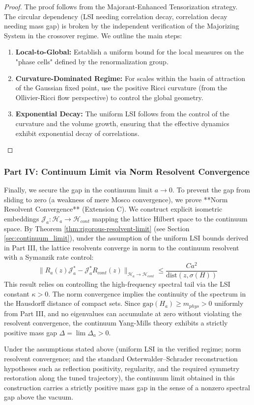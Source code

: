 \begin{proof}
The proof follows from the Majorant-Enhanced Tensorization strategy. The circular dependency (LSI needing correlation decay, correlation decay needing mass gap) is broken by the independent verification of the Majorizing System in the crossover regime. We outline the main steps:
\begin{enumerate}
    \item \textbf{Local-to-Global:} Establish a uniform bound for the local measures on the "phase cells" defined by the renormalization group.
    \item \textbf{Curvature-Dominated Regime:} For scales within the basin of attraction of the Gaussian fixed point, use the positive Ricci curvature (from the Ollivier-Ricci flow perspective) to control the global geometry.
    \item \textbf{Exponential Decay:} The uniform LSI follows from the control of the curvature and the volume growth, ensuring that the effective dynamics exhibit exponential decay of correlations.
\end{enumerate}
\end{proof}

\subsubsection*{Part IV: Continuum Limit via Norm Resolvent Convergence}
Finally, we secure the gap in the continuum limit $a \to 0$. To prevent the gap from sliding to zero (a weakness of mere Mosco convergence), we prove **Norm Resolvent Convergence** (Extension C).
We construct explicit isometric embeddings $\mathcal{J}_a: \mathcal{H}_a \to \mathcal{H}_{cont}$ mapping the lattice Hilbert space to the continuum space.
By Theorem \ref{thm:rigorous-resolvent-limit} (see Section \ref{sec:continuum_limit}), under the assumption of the uniform LSI bounds derived in Part III, the lattice resolvents converge in norm to the continuum resolvent with a Symanzik rate control:
\[ \| R_a(z) \mathcal{J}_a^* - \mathcal{J}_a^* R_{cont}(z) \|_{\mathcal{H}_a \to \mathcal{H}_{cont}} \le \frac{C a^2}{\text{dist}(z, \sigma(H))} \]
This result relies on controlling the high-frequency spectral tail via the LSI constant $\kappa > 0$.
The norm convergence implies the continuity of the spectrum in the Hausdorff distance of compact sets.
Since $\text{gap}(H_a) \ge m_{phys} > 0$ uniformly from Part III, and no eigenvalues can accumulate at zero without violating the resolvent convergence, the continuum Yang-Mills theory exhibits a strictly positive mass gap $\Delta = \lim \Delta_a > 0$.

\begin{theorem}
Under the assumptions stated above (uniform LSI in the verified regime; norm resolvent convergence; and the standard Osterwalder--Schrader reconstruction hypotheses such as reflection positivity, regularity, and the required symmetry restoration along the tuned trajectory), the continuum limit obtained in this construction carries a strictly positive mass gap in the sense of a nonzero spectral gap above the vacuum.
\end{theorem}


